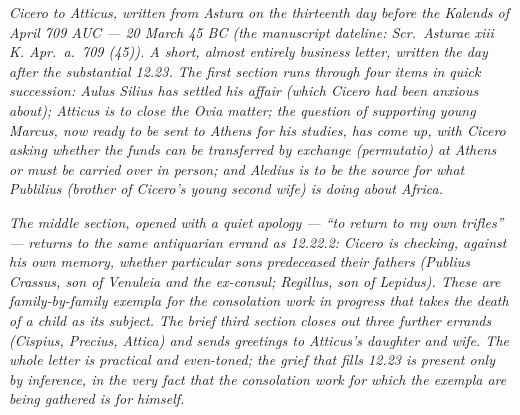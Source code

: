 
\textit{Cicero to Atticus, written from Astura on the
thirteenth day before the Kalends of April 709 AUC ---
20 March 45 BC (the manuscript dateline: \textit{Scr.\
Asturae xiii K. Apr.\ a.\ 709 (45)}). A short, almost
entirely business letter, written the day after the
substantial 12.23. The first section runs through
four items in quick succession: Aulus Silius has
settled his affair (which Cicero had been anxious
about); Atticus is to close the Ovia matter; the
question of supporting young Marcus, now ready to be
sent to Athens for his studies, has come up, with
Cicero asking whether the funds can be transferred by
exchange (\textit{permutatio}) at Athens or must be
carried over in person; and Aledius is to be the
source for what Publilius (brother of Cicero's young
second wife) is doing about Africa.}

\textit{The middle section, opened with a quiet
apology --- ``to return to my own trifles'' ---
returns to the same antiquarian errand as 12.22.2:
Cicero is checking, against his own memory, whether
particular sons predeceased their fathers (Publius
Crassus, son of Venuleia and the ex-consul; Regillus,
son of Lepidus). These are family-by-family
\textit{exempla} for the consolation work in progress
that takes the death of a child as its subject. The
brief third section closes out three further
errands (Cispius, Precius, Attica) and sends greetings
to Atticus's daughter and wife. The whole letter is
practical and even-toned; the grief that fills 12.23
is present only by inference, in the very fact that
the consolation work for which the exempla are being
gathered is for himself.}
